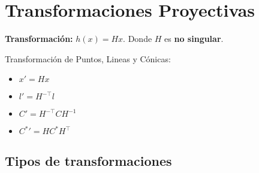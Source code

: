 \documentclass[12pt,a4paper]{article}
\begin{document}
\section{Transformaciones Proyectivas}

{\bf Transformaci\'on:} $h(x)= Hx$. Donde $H$ es {\bf no singular}.

Transformaci\'on de Puntos, Lineas y C\'onicas:

\begin{itemize}
	\item $x'= H x$

	\item $l'= H^{-\top} l$

	\item $C'= H^{-\top} C H^{-1}$

	\item ${C^{*}}'= H C^{*} H^{\top}$
\end{itemize}

\subsection{Tipos de transformaciones}
\end{document}

